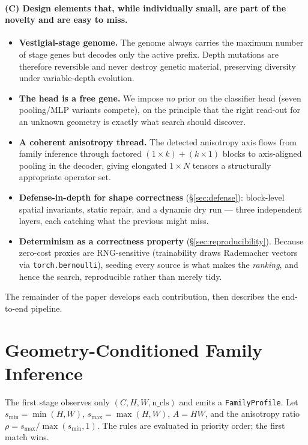 \documentclass[10pt,twocolumn]{article}
\newcommand{\code}[1]{\texttt{\small #1}}
\begin{document}
\paragraph{(C) Design elements that, while individually small, are part of the
novelty and are easy to miss.}
\begin{itemize}\itemsep2pt
\item \textbf{Vestigial-stage genome.} The genome always carries the maximum
  number of stage genes but decodes only the active prefix. Depth mutations are
  therefore reversible and never destroy genetic material, preserving diversity
  under variable-depth evolution.
\item \textbf{The head is a free gene.} We impose \emph{no} prior on the
  classifier head (seven pooling/MLP variants compete), on the principle that
  the right read-out for an unknown geometry is exactly what search should
  discover.
\item \textbf{A coherent anisotropy thread.} The detected anisotropy axis flows
  from family inference through factored $(1{\times}k)+(k{\times}1)$ blocks to
  axis-aligned pooling in the decoder, giving elongated $1{\times}N$ tensors a
  structurally appropriate operator set.
\item \textbf{Defense-in-depth for shape correctness} (\S\ref{sec:defense}):
  block-level spatial invariants, static repair, and a dynamic dry run --- three
  independent layers, each catching what the previous might miss.
\item \textbf{Determinism as a correctness property} (\S\ref{sec:reproducibility}).
  Because zero-cost proxies are RNG-sensitive (trainability draws Rademacher
  vectors via \code{torch.bernoulli}), seeding every source is what makes the
  \emph{ranking}, and hence the search, reproducible rather than merely tidy.
\end{itemize}

The remainder of the paper develops each contribution, then describes the
end-to-end pipeline.

\section{Geometry-Conditioned Family Inference}
\label{sec:family}

The first stage observes only $(C,H,W,\text{n\_cls})$ and emits a
\code{FamilyProfile}. Let $s_{\min}=\min(H,W)$, $s_{\max}=\max(H,W)$,
$A=HW$, and the anisotropy ratio $\rho=s_{\max}/\max(s_{\min},1)$. The rules
are evaluated in priority order; the first match wins.
\end{document}
